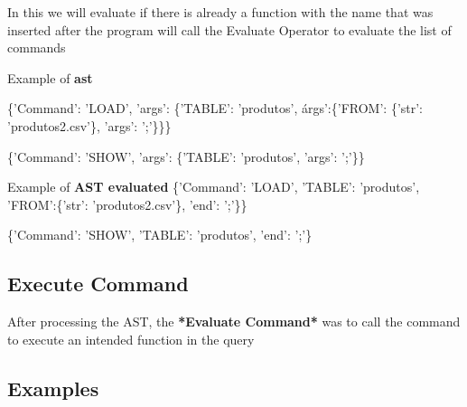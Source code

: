\documentclass{article}
\begin{document}
\setlength{\parindent}{10ex}
In this we will evaluate if there is already a function with the name that was inserted after the program will call the Evaluate Operator to evaluate the list of commands


\vspace{2.0cm}
Example of \textbf{ast}

\{'Command': 'LOAD', 'args': \{'TABLE': 'produtos', \'args':\{'FROM': \{'str': 'produtos2.csv'\},  'args': ';'\}\}\}


\vspace{1.0cm}
\{'Command': 'SHOW', 'args': \{'TABLE': 'produtos', 'args': ';'\}\}

\vspace{1.5cm}
Example of \textbf{AST evaluated}
\{'Command': 'LOAD', 'TABLE': 'produtos', 'FROM':\{'str': 'produtos2.csv'\}, 'end': ';'\}\}


\vspace{1.0cm}
\{'Command': 'SHOW', 'TABLE': 'produtos', 'end': ';'\}


\vspace{0.5cm}
\subsection{Execute Command}
\textbf{}
\setlength{\parindent}{10ex}
After processing the AST, the\textbf{ *Evaluate Command*} was to call the command to execute an intended function in the query
\noindent \textbf{}


\subsection{Examples}
\textbf{}
\end{document}
